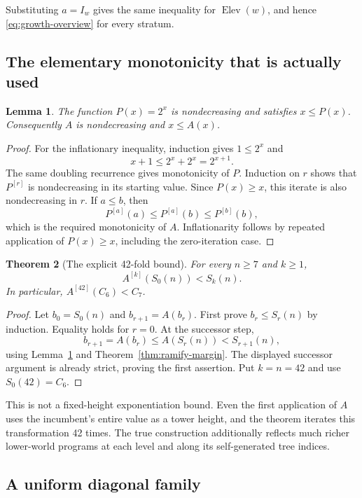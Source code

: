 \documentclass[11pt]{article}
\newtheorem{theorem}{Theorem}[section]
\newtheorem{lemma}[theorem]{Lemma}
\theoremstyle{definition}
\theoremstyle{remark}
\newcommand{\Elev}{\operatorname{Elev}}
\newcommand{\funiter}[2]{#1^{[#2]}}
\begin{document}
Substituting $a=I_w$ gives the same inequality for $\Elev(w)$, and hence
\eqref{eq:growth-overview} for every stratum.

\subsection{The elementary monotonicity that is actually used}

\begin{lemma}\label{lem:Amono}
The function $P(x)=2^x$ is nondecreasing and satisfies $x\le P(x)$.
Consequently $A$ is nondecreasing and $x\le A(x)$.
\end{lemma}
\begin{proof}
For the inflationary inequality, induction gives $1\le2^x$ and
\[
             x+1\le2^x+2^x=2^{x+1}.
\]
The same doubling recurrence gives monotonicity of $P$. Induction on $r$
shows that $\funiter P r$ is nondecreasing in its starting value. Since
$P(x)\ge x$, this iterate is also nondecreasing in $r$.
If $a\le b$, then
\[
 \funiter P a(a)\le\funiter P a(b)\le\funiter P b(b),
\]
which is the required monotonicity of $A$. Inflationarity follows by repeated
application of $P(x)\ge x$, including the zero-iteration case.
\end{proof}

\begin{theorem}[The explicit 42-fold bound]\label{thm:main}
For every $n\ge7$ and $k\ge1$,
\[
                  \funiter A{k}(S_0(n))<S_k(n).
\]
In particular, $\funiter A{42}(C_6)<C_7$.
\end{theorem}
\begin{proof}
Let $b_0=S_0(n)$ and $b_{r+1}=A(b_r)$. First prove $b_r\le S_r(n)$ by
induction. Equality holds for $r=0$. At the successor step,
\[
 b_{r+1}=A(b_r)\le A(S_r(n))<S_{r+1}(n),
\]
using Lemma~\ref{lem:Amono} and Theorem~\ref{thm:ramify-margin}. The displayed
successor argument is already strict, proving the first assertion. Put
$k=n=42$ and use $S_0(42)=C_6$.
\end{proof}

This is not a fixed-height exponentiation bound. Even the first application
of $A$ uses the incumbent's entire value as a tower height, and the theorem
iterates this transformation 42 times. The true construction additionally
reflects much richer lower-world programs at each level and along its
self-generated tree indices.

\subsection{A uniform diagonal family}
\end{document}
